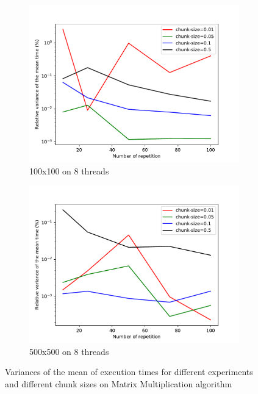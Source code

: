 \documentclass[12pt]{article}
\begin{document}
\begin{figure}
\begin{subfigure}[b]{0.475\textwidth}
		\centering 
		\includegraphics[width=\textwidth]{images/relvar_100_8.pdf}
		\caption[]%
		{{\small 100x100 on 8 threads}}    
	\end{subfigure}
	\quad
	\begin{subfigure}[b]{0.475\textwidth}   
		\centering 
		\includegraphics[width=\textwidth]{images/relvar_500_8.pdf}
		\caption[]%
		{{\small 500x500 on 8 threads}}    
\end{subfigure}
	\caption[Standard deviations]
	{\small Variances of the mean of execution times for different experiments  and different chunk sizes on Matrix Multiplication algorithm} 

\end{figure}
\newpage
\end{document}
